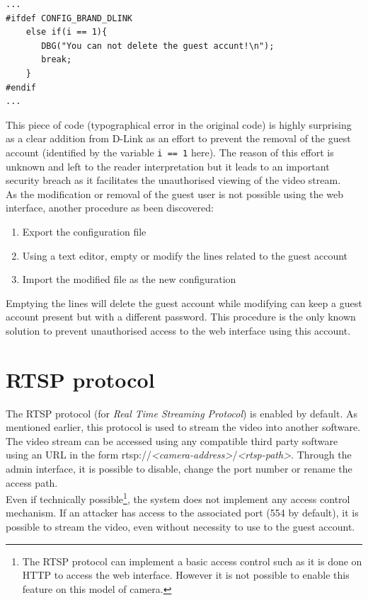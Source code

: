 {\scriptsize
\begin{verbatim}
...
#ifdef CONFIG_BRAND_DLINK
    else if(i == 1){
       DBG("You can not delete the guest accunt!\n");
       break;
    }
#endif
...
\end{verbatim}
}

This piece of code (typographical error in the original code) is highly surprising as a clear addition from D-Link as an effort to prevent the removal of the guest account (identified by the variable \texttt{i == 1} here).
The reason of this effort is unknown and left to the reader interpretation but it leads to an important security breach as it facilitates the unauthorised viewing of the video stream.\\

As the modification or removal of the guest user is not possible using the web interface, another procedure as been discovered:

\begin{enumerate}
\item Export the configuration file
\item Using a text editor, empty or modify the lines related to the guest account
\item Import the modified file as the new configuration
\end{enumerate}

Emptying the lines will delete the guest account while modifying can keep a guest account present but with a different password.
This procedure is the only known solution to prevent unauthorised access to the web interface using this account.

\section{RTSP protocol}
\label{sec:dcs-rtsp}

The RTSP protocol (for \emph{Real Time Streaming Protocol}) is enabled by default.
As mentioned earlier, this protocol is used to stream the video into another software.
The video stream can be accessed using any compatible third party software using an URL in the form rtsp://\emph{\textless camera-address\textgreater}/\emph{\textless rtsp-path\textgreater}.
Through the admin interface, it is possible to disable, change the port number or rename the access path.\\

Even if technically possible\footnote{The RTSP protocol can implement a basic access control such as it is done on HTTP to access the web interface. However it is not possible to enable this feature on this model of camera.}, the system does not implement any access control mechanism.
If an attacker has access to the associated port (554 by default), it is possible to stream the video, even without necessity to use to the guest account.\\

